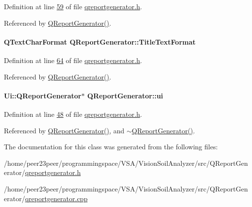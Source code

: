 Definition at line \hyperlink{qreportgenerator_8h_source_l00059}{59} of file \hyperlink{qreportgenerator_8h_source}{qreportgenerator.\+h}.



Referenced by \hyperlink{qreportgenerator_8cpp_source_l00004}{Q\+Report\+Generator()}.

\hypertarget{class_q_report_generator_a7eebc837740d933bf4767e584f1d486c}{}
\paragraph[{Title\+Text\+Format}]{\setlength{\rightskip}{0pt plus 5cm}Q\+Text\+Char\+Format Q\+Report\+Generator\+::\+Title\+Text\+Format\hspace{0.3cm}{\ttfamily [private]}}\label{class_q_report_generator_a7eebc837740d933bf4767e584f1d486c}


Definition at line \hyperlink{qreportgenerator_8h_source_l00064}{64} of file \hyperlink{qreportgenerator_8h_source}{qreportgenerator.\+h}.



Referenced by \hyperlink{qreportgenerator_8cpp_source_l00004}{Q\+Report\+Generator()}.

\hypertarget{class_q_report_generator_a4584dd4f053586b84b4a9f883a3313d9}{}
\paragraph[{ui}]{\setlength{\rightskip}{0pt plus 5cm}Ui\+::\+Q\+Report\+Generator$\ast$ Q\+Report\+Generator\+::ui\hspace{0.3cm}{\ttfamily [private]}}\label{class_q_report_generator_a4584dd4f053586b84b4a9f883a3313d9}


Definition at line \hyperlink{qreportgenerator_8h_source_l00048}{48} of file \hyperlink{qreportgenerator_8h_source}{qreportgenerator.\+h}.



Referenced by \hyperlink{qreportgenerator_8cpp_source_l00004}{Q\+Report\+Generator()}, and \hyperlink{qreportgenerator_8cpp_source_l00394}{$\sim$\+Q\+Report\+Generator()}.



The documentation for this class was generated from the following files\+:\begin{DoxyCompactItemize}
\item 
/home/peer23peer/programmingspace/\+V\+S\+A/\+Vision\+Soil\+Analyzer/src/\+Q\+Report\+Generator/\hyperlink{qreportgenerator_8h}{qreportgenerator.\+h}\item 
/home/peer23peer/programmingspace/\+V\+S\+A/\+Vision\+Soil\+Analyzer/src/\+Q\+Report\+Generator/\hyperlink{qreportgenerator_8cpp}{qreportgenerator.\+cpp}\end{DoxyCompactItemize}
